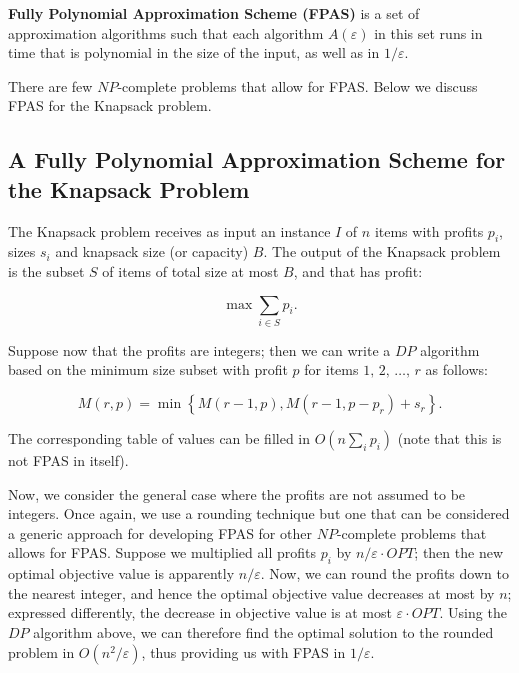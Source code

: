 \documentclass{article}
\begin{document}
\begin{definition}
\textbf{Fully Polynomial Approximation Scheme (FPAS)} is a set of approximation algorithms such
that each algorithm $A(\varepsilon)$ in this set runs in time that is polynomial in the size of
the input, as well as in $1/ \varepsilon$.
\end{definition}

There are few $NP$-complete problems that allow for FPAS. Below we discuss FPAS for the Knapsack
problem.

\subsection{A Fully Polynomial Approximation Scheme for the Knapsack Problem}

The Knapsack problem receives as input an instance $I$ of $n$ items with profits $p_i$, sizes
$s_i$ and knapsack size (or capacity) $B$. The output of the Knapsack problem is the subset $S$ of
items of total size at most $B$, and that has profit:

$$
\max \sum\limits_{i \in S} p_i.
$$

Suppose now that the profits are integers; then we can write a $DP$ algorithm based on the minimum
size subset with profit $p$ for items $1, \, 2, \, \ldots, \, r$ as follows:

$$
M(r,p) = \min \left\{ M(r-1,p), M(r-1, p-p_r) + s_r \right\}.
$$

The corresponding table of values can be filled in $O\left(n \sum_i p_i \right)$ (note that this
is not FPAS in itself).

Now, we consider the general case where the profits are not assumed to be integers. Once again, we
use a rounding technique but one that can be considered a generic approach for developing FPAS for
other $NP$-complete problems that allows for FPAS. Suppose we multiplied all profits $p_i$ by
$n/\varepsilon \cdot OPT$; then the new optimal objective value is apparently $n/\varepsilon$.
Now, we can round the profits down to the nearest integer, and hence the optimal objective value
decreases at most by $n$; expressed differently, the decrease in objective value is at most
$\varepsilon \cdot OPT$. Using the $DP$ algorithm above, we can therefore find the optimal
solution to the rounded problem in $O(n^2/ \varepsilon)$, thus providing us with FPAS in
$1/\varepsilon$.
\end{document}
